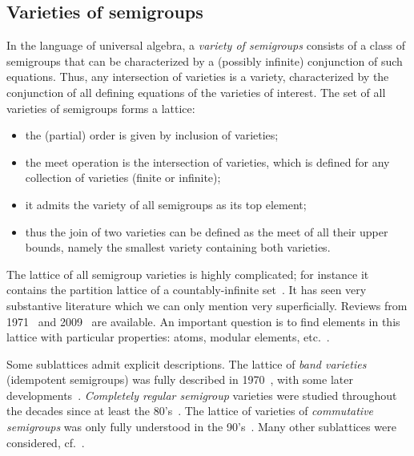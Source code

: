 \documentclass[12pt]{amsart}
\theoremstyle{plain}
\theoremstyle{definition}
\begin{document}
\subsection{Varieties of semigroups}
\label{subsec:varieties}

In the language of universal algebra, a \emph{variety of semigroups} consists of a class of semigroups that can be characterized by a (possibly infinite) conjunction of such equations.  Thus, any intersection of varieties is a variety, characterized by the conjunction of all defining equations of the varieties of interest.
The set of all varieties of semigroups forms a lattice:
\begin{itemize}
\item the (partial) order is given by inclusion of varieties;
\item the meet operation is the intersection of varieties, which is defined for any collection of varieties (finite or infinite);
\item it admits the variety of all semigroups as its top element;
\item thus the join of two varieties can be defined as the meet of all their upper bounds, namely the smallest variety containing both varieties.
\end{itemize}

The lattice of all semigroup varieties is highly complicated; for instance it contains the partition lattice of a countably-infinite set~\cite{burris1971embedding,jevzek1976intervals}.  It has seen very substantive literature which we can only mention very superficially.
Reviews from 1971~\cite{evans1971lattice} and 2009~\cite{shevrin2009lattices} are available.
An important question is to find elements in this lattice with particular properties: atoms, modular elements, etc.~\cite{vernikov2007modular,vernikov2015special,skokov2025modular}.

Some sublattices admit explicit descriptions.
The lattice of \emph{band varieties} (idempotent semigroups) was fully described in 1970~\cite{biryukov1970varieties,fennemore1970all,GERHARD1970195}, with some later developments~\cite{wismath1986lattices,https://doi.org/10.1112/plms/s3-58.2.323,ghosh2005varieties,sapir2005variety,pastijn2005varieties}.
\emph{Completely regular semigroup} varieties were studied throughout the decades since at least the 80's~\cite{petrich1982varieties,jones1983lattice,reilly1985varieties,pastijn1985lattices,polak1985varieties,reilly1987lattice,polak1987varieties,polak1988varieties,trotter1989subdirect,pastijn1990lattice,reilly1990completely,pastijn1991pseudovarieties,zhang1996infinite,petrich2007canonical,Petrich03042014,petrich2015varieties,petrich2017another,petrich2018certain,petrich2024completely}.
The lattice of varieties of \emph{commutative semigroups} was only fully understood in the 90's~\cite{kisielewicz1994varieties}.
Many other sublattices were considered, cf.~\cite{petrich1974all,dolinka2001lattice,gusev2020lattice}.
\end{document}

